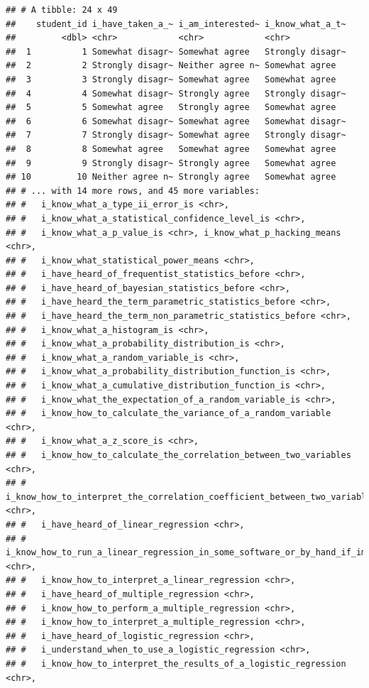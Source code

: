 \documentclass[
]{book}
\begin{document}
\begin{verbatim}
## # A tibble: 24 x 49
##    student_id i_have_taken_a_~ i_am_interested~ i_know_what_a_t~
##         <dbl> <chr>            <chr>            <chr>           
##  1          1 Somewhat disagr~ Somewhat agree   Strongly disagr~
##  2          2 Strongly disagr~ Neither agree n~ Somewhat agree  
##  3          3 Strongly disagr~ Somewhat agree   Somewhat agree  
##  4          4 Somewhat disagr~ Strongly agree   Strongly disagr~
##  5          5 Somewhat agree   Strongly agree   Somewhat agree  
##  6          6 Somewhat disagr~ Somewhat agree   Somewhat disagr~
##  7          7 Strongly disagr~ Somewhat agree   Strongly disagr~
##  8          8 Somewhat agree   Somewhat agree   Somewhat agree  
##  9          9 Strongly disagr~ Strongly agree   Somewhat agree  
## 10         10 Neither agree n~ Strongly agree   Somewhat agree  
## # ... with 14 more rows, and 45 more variables:
## #   i_know_what_a_type_ii_error_is <chr>,
## #   i_know_what_a_statistical_confidence_level_is <chr>,
## #   i_know_what_a_p_value_is <chr>, i_know_what_p_hacking_means <chr>,
## #   i_know_what_statistical_power_means <chr>,
## #   i_have_heard_of_frequentist_statistics_before <chr>,
## #   i_have_heard_of_bayesian_statistics_before <chr>,
## #   i_have_heard_the_term_parametric_statistics_before <chr>,
## #   i_have_heard_the_term_non_parametric_statistics_before <chr>,
## #   i_know_what_a_histogram_is <chr>,
## #   i_know_what_a_probability_distribution_is <chr>,
## #   i_know_what_a_random_variable_is <chr>,
## #   i_know_what_a_probability_distribution_function_is <chr>,
## #   i_know_what_a_cumulative_distribution_function_is <chr>,
## #   i_know_what_the_expectation_of_a_random_variable_is <chr>,
## #   i_know_how_to_calculate_the_variance_of_a_random_variable <chr>,
## #   i_know_what_a_z_score_is <chr>,
## #   i_know_how_to_calculate_the_correlation_between_two_variables <chr>,
## #   i_know_how_to_interpret_the_correlation_coefficient_between_two_variables <chr>,
## #   i_have_heard_of_linear_regression <chr>,
## #   i_know_how_to_run_a_linear_regression_in_some_software_or_by_hand_if_im_feeling_wild <chr>,
## #   i_know_how_to_interpret_a_linear_regression <chr>,
## #   i_have_heard_of_multiple_regression <chr>,
## #   i_know_how_to_perform_a_multiple_regression <chr>,
## #   i_know_how_to_interpret_a_multiple_regression <chr>,
## #   i_have_heard_of_logistic_regression <chr>,
## #   i_understand_when_to_use_a_logistic_regression <chr>,
## #   i_know_how_to_interpret_the_results_of_a_logistic_regression <chr>,

\end{verbatim}
\end{document}
